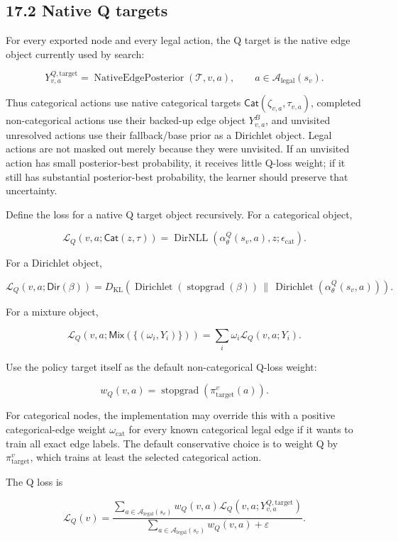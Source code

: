 \documentclass[11pt]{article}
\newcommand{\Dir}{\operatorname{Dirichlet}}
\newcommand{\stopgrad}{\operatorname{stopgrad}}
\newcommand{\Tree}{\mathcal{T}}
\newcommand{\Legal}{\mathcal{A}_{\mathrm{legal}}}
\newcommand{\KL}{D_{\mathrm{KL}}}
\newcommand{\epscat}{\epsilon_{\mathrm{cat}}}
\newcommand{\DirNLL}{\operatorname{DirNLL}}
\newcommand{\DirObj}{\mathsf{Dir}}
\newcommand{\CatObj}{\mathsf{Cat}}
\newcommand{\MixObj}{\mathsf{Mix}}
\newcommand{\NativeEdgePosterior}{\operatorname{NativeEdgePosterior}}
\begin{document}
\subsection*{17.2 Native Q targets}

For every exported node and every legal action, the Q target is the native edge
object currently used by search:

\[
Y^{Q,\mathrm{target}}_{v,a}
=
\NativeEdgePosterior(\Tree,v,a),
\qquad
 a\in\Legal(s_v).
\]

Thus categorical actions use native categorical targets
\(\CatObj(\zeta_{v,a},\tau_{v,a})\), completed non-categorical actions use their
backed-up edge object \(Y^B_{v,a}\), and unvisited unresolved actions use their
fallback/base prior as a Dirichlet object. Legal actions are not masked out
merely because they were unvisited. If an unvisited action has small
posterior-best probability, it receives little Q-loss weight; if it still has
substantial posterior-best probability, the learner should preserve that
uncertainty.

Define the loss for a native Q target object recursively. For a categorical
object,

\[
\mathcal{L}_Q(v,a;\CatObj(z,\tau))
=
\DirNLL(\alpha_\theta^Q(s_v,a),z;\epscat).
\]

For a Dirichlet object,

\[
\mathcal{L}_Q(v,a;\DirObj(\beta))
=
\KL
\left(
\Dir
\left(
\stopgrad(\beta)
\right)
\,\|\,
\Dir
\left(
\alpha_\theta^Q(s_v,a)
\right)
\right).
\]

For a mixture object,

\[
\mathcal{L}_Q\left(v,a;\MixObj(\{(\omega_i,Y_i)\})\right)
=
\sum_i\omega_i\mathcal{L}_Q(v,a;Y_i).
\]

Use the policy target itself as the default non-categorical Q-loss weight:

\[
w_Q(v,a)=\stopgrad\left(\pi_{\mathrm{target}}^v(a)\right).
\]

For categorical nodes, the implementation may override this with a positive
categorical-edge weight \(\omega_{\mathrm{cat}}\) for every known categorical
legal edge if it wants to train all exact edge labels. The default conservative
choice is to weight Q by \(\pi_{\mathrm{target}}^v\), which trains at least the
selected categorical action.

The Q loss is

\[
\mathcal{L}_Q(v)
=
\frac{
\sum_{a\in\Legal(s_v)}
 w_Q(v,a)
\mathcal{L}_Q(v,a;Y^{Q,\mathrm{target}}_{v,a})
}{
\sum_{a\in\Legal(s_v)}w_Q(v,a)+\varepsilon
}.
\]
\end{document}
